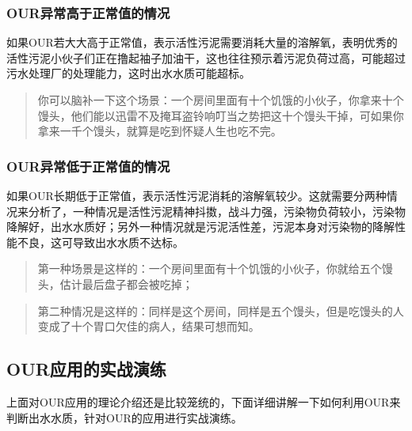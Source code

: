 \documentclass[]{book}
\begin{document}
\hypertarget{ourux5f02ux5e38ux9ad8ux4e8eux6b63ux5e38ux503cux7684ux60c5ux51b5}{%
\subsubsection{OUR异常高于正常值的情况}\label{ourux5f02ux5e38ux9ad8ux4e8eux6b63ux5e38ux503cux7684ux60c5ux51b5}}

如果OUR若大大高于正常值，表示活性污泥需要消耗大量的溶解氧，表明优秀的活性污泥小伙子们正在撸起袖子加油干，这也往往预示着污泥负荷过高，可能超过污水处理厂的处理能力，这时出水水质可能超标。

\begin{quote}
你可以脑补一下这个场景：一个房间里面有十个饥饿的小伙子，你拿来十个馒头，他们能以迅雷不及掩耳盗铃响叮当之势把这十个馒头干掉，可如果你拿来一千个馒头，就算是吃到怀疑人生也吃不完。
\end{quote}

\hypertarget{ourux5f02ux5e38ux4f4eux4e8eux6b63ux5e38ux503cux7684ux60c5ux51b5}{%
\subsubsection{OUR异常低于正常值的情况}\label{ourux5f02ux5e38ux4f4eux4e8eux6b63ux5e38ux503cux7684ux60c5ux51b5}}

如果OUR长期低于正常值，表示活性污泥消耗的溶解氧较少。这就需要分两种情况来分析了，一种情况是活性污泥精神抖擞，战斗力强，污染物负荷较小，污染物降解好，出水水质好；另外一种情况就是污泥活性差，污泥本身对污染物的降解性能不良，这可导致出水水质不达标。

\begin{quote}
第一种场景是这样的：一个房间里面有十个饥饿的小伙子，你就给五个馒头，估计最后盘子都会被吃掉；
\end{quote}

\begin{quote}
第二种情况是这样的：同样是这个房间，同样是五个馒头，但是吃馒头的人变成了十个胃口欠佳的病人，结果可想而知。
\end{quote}

\hypertarget{ourux5e94ux7528ux7684ux5b9eux6218ux6f14ux7ec3}{%
\subsection{OUR应用的实战演练}\label{ourux5e94ux7528ux7684ux5b9eux6218ux6f14ux7ec3}}

上面对OUR应用的理论介绍还是比较笼统的，下面详细讲解一下如何利用OUR来判断出水水质，针对OUR的应用进行实战演练。
\end{document}
